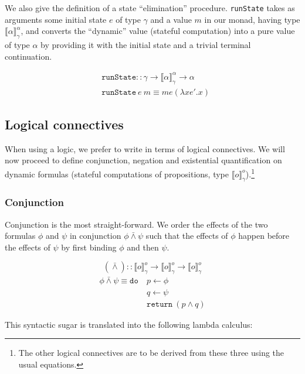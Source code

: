 \documentclass{article}
\newcommand{\dand}{\mathbin{\bar{\land}}}
\newcommand{\statecps}[3]{\llbracket #3 \rrbracket^{#2}_{#1}}
\begin{document}
We also give the definition of a state ``elimination''
procedure. \texttt{runState} takes as arguments some initial state $e$ of type
$\gamma$ and a value $m$ in our monad, having type
$\statecps{\gamma}{\alpha}{\alpha}$, and converts the ``dynamic'' value
(stateful computation) into a pure value of type $\alpha$ by providing it with
the initial state and a trivial terminal continuation.

\begin{align*}
& \texttt{runState} :: \gamma \to \statecps{\gamma}{\alpha}{\alpha} \to \alpha \\
& \texttt{runState}\ e\ m \equiv m e (\lambda x e'. x)
\end{align*}



\subsection{Logical connectives}

When using a logic, we prefer to write in terms of logical connectives. We
will now proceed to define conjunction, negation and existential
quantification on dynamic formulas (stateful computations of propositions,
type $\statecps{\gamma}{o}{o}$).\footnote{The other logical connectives are to
  be derived from these three using the usual equations.}


\subsubsection{Conjunction}

Conjunction is the most straight-forward. We order the effects of the two
formulas $\phi$ and $\psi$ in conjunction $\phi \dand \psi$ such that the
effects of $\phi$ happen before the effects of $\psi$ by first binding $\phi$
and then $\psi$.

$$
(\dand) :: \statecps{\gamma}{o}{o} \to \statecps{\gamma}{o}{o}
           \to \statecps{\gamma}{o}{o}
$$
\vspace{-2em}
\begin{align*}
\phi \dand \psi \equiv \texttt{do}\ & p \gets \phi \\
                                    & q \gets \psi \\
                                    & \texttt{return}\ (p \land q)
\end{align*} 

This syntactic sugar is translated into the following lambda calculus:
\end{document}
